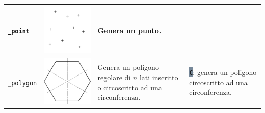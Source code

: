 \documentclass[..]{../IEEEphot}
\newcommand{\param}[1]{\colorbox{LightSlateGray}{\color{Navy}\texttt{\textbf{#1}}}}
\begin{document}
\begin{center}
\begin{longtable}{m{.1\linewidth}m{.2\linewidth}m{.3\linewidth}m{.3\linewidth}}
\texttt{\_point} & \includegraphics[width = 0.8\linewidth, keepaspectratio]{../images/jpg/_point.jpg} & Genera un punto. &  \\	
\midrule
\texttt{\_polygon} & \includegraphics[width = 0.8\linewidth, keepaspectratio]{../images/jpg/_polygon.jpg} & Genera un poligono regolare di $n$ lati inscritto o circoscritto ad una circonferenza. & 
\param{C}: genera un poligono circoscritto ad una circonferenza.


\end{longtable}
\end{center}
\end{document}
